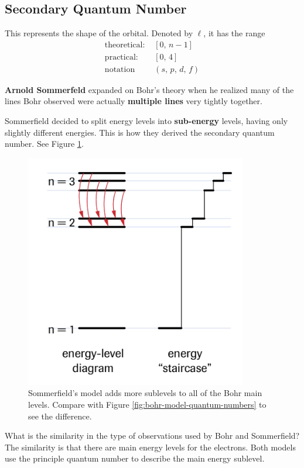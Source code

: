 \subsection{Secondary Quantum Number}
This represents the shape of the orbital. Denoted by $\ell$, it has the range 
\begin{align*}
    \text{theoretical: }&[0,\,n-1]\\
    \text{practical: }&[0,\,4]\\
    \text{notation }&(s,\,p,\,d,\,f)
\end{align*}
\begin{bulleted-list}
    \item \textbf{Arnold Sommerfeld} expanded on Bohr's theory when he realized many
        of the lines Bohr observed were actually \textbf{multiple lines} very tightly
        together.
    \item Sommerfield decided to split energy levels into \textbf{sub-energy} levels,
        having only slightly different energies. This is how they derived the secondary 
        quantum number. See Figure \ref{fig:sommerfield-model}.
\end{bulleted-list}

\begin{figure}[ht!]
    \centering
    \includegraphics[width=0.4 \textwidth]{../figures/sommerfield-model.png}
    \caption{Sommerfield's model adds more sublevels to all of the Bohr main levels. Compare with
        Figure \ref{fig:bohr-model-quantum-numbers} to see the difference.}
    \label{fig:sommerfield-model}
\end{figure}

\begin{sample}{What is the similarity in the type of observations used by Bohr and Sommerfield?}
    The similarity is that there are main energy levels for the electrons. Both models use
    the principle quantum number to describe the main energy sublevel.
\end{sample}

